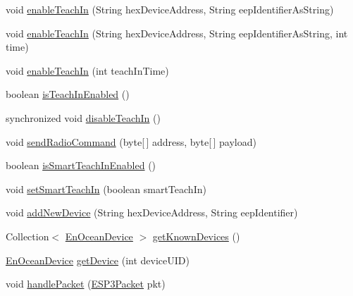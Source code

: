 \begin{DoxyCompactItemize}
\item 
void \hyperlink{classit_1_1polito_1_1elite_1_1enocean_1_1enj_1_1communication_1_1_en_j_connection_af3248db04c2dfd43b068b10513f32e8b}{enable\+Teach\+In} (String hex\+Device\+Address, String eep\+Identifier\+As\+String)
\item 
void \hyperlink{classit_1_1polito_1_1elite_1_1enocean_1_1enj_1_1communication_1_1_en_j_connection_acbb95c1e5e75cd5abdbe569400667a2a}{enable\+Teach\+In} (String hex\+Device\+Address, String eep\+Identifier\+As\+String, int time)
\item 
void \hyperlink{classit_1_1polito_1_1elite_1_1enocean_1_1enj_1_1communication_1_1_en_j_connection_a2d2c099a22e34a75ad6fa5123280f90f}{enable\+Teach\+In} (int teach\+In\+Time)
\item 
boolean \hyperlink{classit_1_1polito_1_1elite_1_1enocean_1_1enj_1_1communication_1_1_en_j_connection_a479da123130eaeba3b2acb0d1081f1d6}{is\+Teach\+In\+Enabled} ()
\item 
synchronized void \hyperlink{classit_1_1polito_1_1elite_1_1enocean_1_1enj_1_1communication_1_1_en_j_connection_a59ed84d534b7cd0bd03466fdc54b5585}{disable\+Teach\+In} ()
\item 
void \hyperlink{classit_1_1polito_1_1elite_1_1enocean_1_1enj_1_1communication_1_1_en_j_connection_a60a333560c00fb3d77744ccb356481f9}{send\+Radio\+Command} (byte\mbox{[}$\,$\mbox{]} address, byte\mbox{[}$\,$\mbox{]} payload)
\item 
boolean \hyperlink{classit_1_1polito_1_1elite_1_1enocean_1_1enj_1_1communication_1_1_en_j_connection_a3564e56e836696faed055d05a5f50292}{is\+Smart\+Teach\+In\+Enabled} ()
\item 
void \hyperlink{classit_1_1polito_1_1elite_1_1enocean_1_1enj_1_1communication_1_1_en_j_connection_ac654fdac8366447066255d0b6e397941}{set\+Smart\+Teach\+In} (boolean smart\+Teach\+In)
\item 
void \hyperlink{classit_1_1polito_1_1elite_1_1enocean_1_1enj_1_1communication_1_1_en_j_connection_a97719e77975bdc3502ccfff320b3642e}{add\+New\+Device} (String hex\+Device\+Address, String eep\+Identifier)
\item 
Collection$<$ \hyperlink{classit_1_1polito_1_1elite_1_1enocean_1_1enj_1_1model_1_1_en_ocean_device}{En\+Ocean\+Device} $>$ \hyperlink{classit_1_1polito_1_1elite_1_1enocean_1_1enj_1_1communication_1_1_en_j_connection_a95fb186c70d14dc35c629322763d12d3}{get\+Known\+Devices} ()
\item 
\hyperlink{classit_1_1polito_1_1elite_1_1enocean_1_1enj_1_1model_1_1_en_ocean_device}{En\+Ocean\+Device} \hyperlink{classit_1_1polito_1_1elite_1_1enocean_1_1enj_1_1communication_1_1_en_j_connection_a257b906ded59609018f129d6d62926c4}{get\+Device} (int device\+U\+ID)
\item 
void \hyperlink{classit_1_1polito_1_1elite_1_1enocean_1_1enj_1_1communication_1_1_en_j_connection_ad182a8d74dda136f692a69c86d29cb09}{handle\+Packet} (\hyperlink{classit_1_1polito_1_1elite_1_1enocean_1_1protocol_1_1serial_1_1v3_1_1network_1_1packet_1_1_e_s_p3_packet}{E\+S\+P3\+Packet} pkt)
\end{DoxyCompactItemize}
